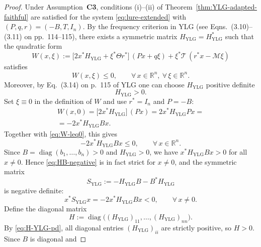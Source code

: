 \documentclass[journal]{IEEEtran}
\theoremstyle{myplain}
\begin{document}
\begin{proof}
Under Assumption~\textbf{C3}, conditions \textup{(i)}–\textup{(ii)}
of Theorem~\ref{thm:YLG-adapted-faithful} are satisfied for the system
\eqref{eq:lure-extended} with $(P,q,r)=(-B,T,I_n)$.  By the frequency
criterion in YLG (see Eqns.~(3.10)–(3.11) on pp.~114–115), there
exists a symmetric matrix $H_{\mathrm{YLG}}=H_{\mathrm{YLG}}^{*}$
such that the quadratic form
\[
  W(x,\xi)
  := \bigl[2x^{*}H_{\mathrm{YLG}} + \xi^{*}\Theta r^{*}\bigr]\,
     (P x + q\xi)
     + \xi^{*}\mathcal{T}\,(r^{*}x - \mathcal{M}\xi)
\]
satisfies
\begin{equation}\label{eq:W-leq0}
  W(x,\xi) \le 0,
  \qquad \forall\,x\in\mathbb{R}^n,\ \forall\,\xi\in\mathbb{R}^n.
\end{equation}
Moreover, by Eq.~(3.14) on p.~115 of YLG one can choose
$H_{\mathrm{YLG}}$ positive definite
\begin{equation}\label{eq:H-YLG-pd}
  H_{\mathrm{YLG}} > 0 .
\end{equation}
Set $\xi\equiv 0$ in the definition of $W$ and use $r^{*}=I_n$ and
$P=-B$:
\begin{multline*}
  W(x,0)
   = \bigl[2x^{*}H_{\mathrm{YLG}}\bigr]\,(P x)
   = 2x^{*}H_{\mathrm{YLG}}P x = \\
   = -2x^{*}H_{\mathrm{YLG}}B x .    
\end{multline*}
Together with \eqref{eq:W-leq0}, this gives
\begin{equation}\label{eq:HB-negative}
  -2x^{*}H_{\mathrm{YLG}}B x \le 0,
  \qquad \forall\,x\in\mathbb{R}^n.
\end{equation}
Since $B=\operatorname{diag}(b_1,\dots,b_n)> 0$ and
$H_{\mathrm{YLG}}> 0$, we have $x^{*}H_{\mathrm{YLG}}Bx>0$ for
all $x\neq 0$.  Hence \eqref{eq:HB-negative} is in fact strict for
$x\neq0$, and the symmetric matrix
\[
  S_{\mathrm{YLG}}
  := -H_{\mathrm{YLG}}B - B^{*}H_{\mathrm{YLG}}
\]
is negative definite:
\begin{equation}\label{eq:SYLG-negative}
  x^{*}S_{\mathrm{YLG}}x
  = -2x^{*}H_{\mathrm{YLG}}B x < 0,
  \qquad \forall\,x\neq 0 .
\end{equation}
Define the diagonal matrix
\begin{equation}\label{eq:H-diag-def}
  H := \operatorname{diag}\bigl((H_{\mathrm{YLG}})_{11},
                         \dots,
                         (H_{\mathrm{YLG}})_{nn}\bigr).
\end{equation}
By \eqref{eq:H-YLG-pd}, all diagonal entries $(H_{\mathrm{YLG}})_{ii}$
are strictly positive, so $H> 0$.  Since $B$ is diagonal and

\end{proof}
\end{document}
